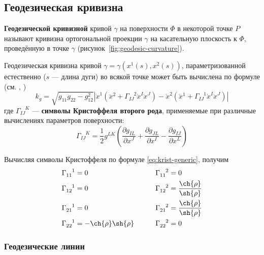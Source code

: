 \documentclass{article}
\numberwithin{equation}{section}
\newcommand{\krist}[3]{\Gamma^{\phantom{#1 #2}#3}_{#1 #2}}
\newcommand{\neword}[1]{\textbf{#1}}
\providecommand{\abs}[1]{\left \lvert{#1}\right \rvert}
\begin{document}
\subsection{Геодезическая кривизна}

\neword{Геодезической кривизной} кривой $\gamma$ на поверхности $\Phi$
в некоторой точке $P$ называют кривизна ортогональной проекции
$\gamma$ на касательную плоскость к $\Phi$, проведённую в точке
$\gamma$ (рисунок \ref{fig:geodesic-curvature}).



Геодезическая кривизна кривой $\gamma = \gamma(x^1(s), x^2(s))$,
параметризованной естественно ($s$ — длина дуги) во всякой точке может
быть вычислена по формуле (см. \cite{pogorelov74}, \cite{rashevsky50})
\begin{equation}\label{eq:geodesic-curvature}
  k_g = \sqrt{g_{11} g_{22} - g_{12}^2}\abs{\dot{x}^1 (\ddot{x}^2 +
    \krist{I}{J}{2} \dot{x}^I \dot{x}^J) - \dot{x}^2 (\ddot{x}^1 +
    \krist{I}{J}{1} \dot{x}^I \dot{x}^J)}
\end{equation}
где $\krist{I}{J}{K}$ — \neword{символы Кристоффеля второго рода},
применяемые при различные вычислениях параметров поверхности:
\begin{equation}\label{eq:krist-generic}
  \krist{I}{J}{K} = \frac{1}{2} g^{LK} \left (
    \frac{\partial{g_{IL}}}{\partial{x^J}} +
    \frac{\partial{g_{JL}}}{\partial{x^I}} -
    \frac{\partial{g_{IJ}}}{\partial{x^L}} \right )
\end{equation}

Вычисляя символы Кристоффеля по формуле \eqref{eq:krist-generic},
получим
\begin{equation}\label{eq:krist}
  \begin{aligned}
    \krist{1}{1}{1} &= 0 &\qquad \krist{1}{1}{2} &= 0 \\
    \krist{1}{2}{1} &= 0 &\qquad \krist{1}{2}{2} &= \frac{\ch{\rho}}{\sh{\rho}} \\
    \krist{2}{1}{1} &= 0 &\qquad \krist{2}{1}{2} &= \frac{\ch{\rho}}{\sh{\rho}} \\
    \krist{2}{2}{1} &= -\ch{\rho} \sh{\rho} &\qquad \krist{2}{2}{2} & = 0
  \end{aligned}
\end{equation}
  
\subsubsection{Геодезические линии}
\end{document}
